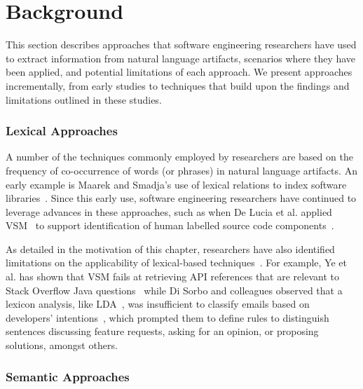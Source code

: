 \clearpage

\section{Background}
\label{cp5:background}


This section describes approaches that software engineering researchers have used to extract information from natural language artifacts, scenarios where they have been applied, and potential limitations of each approach. We present approaches incrementally, from early studies to techniques that build upon the findings
and limitations outlined in these studies.



\subsubsection{Lexical Approaches}


A number of the techniques commonly employed by researchers are based on the
frequency of co-occurrence of words (or phrases) in natural language artifacts. 
An early example is Maarek and Smadja's use of lexical relations to index
software libraries~\cite{maarek1989}. 
Since this early use, software engineering
researchers have continued to leverage advances in
these approaches, such as when De Lucia et al. applied \acf{VSM}~\cite{DeLucia2012}
to support identification of human labelled source code components~\cite{Lin2021}.



As detailed in the motivation of this chapter, 
researchers have also identified limitations on the applicability of lexical-based techniques~\cite{silva2019, Ye2016, Sorbo2015}. For example, Ye et al. has shown that \acs{VSM} 
fails at retrieving API references that are relevant to Stack Overflow Java questions~\cite{Ye2016} while
Di Sorbo and colleagues observed that a lexicon analysis, like \acs{LDA}~\cite{blei2003latent}, was insufficient to classify emails based on developers' intentions~\cite{Sorbo2015}, which prompted them 
to define rules to
distinguish sentences discussing feature requests, asking for an
opinion, or proposing solutions, amongst others.


\subsubsection{Semantic Approaches}



